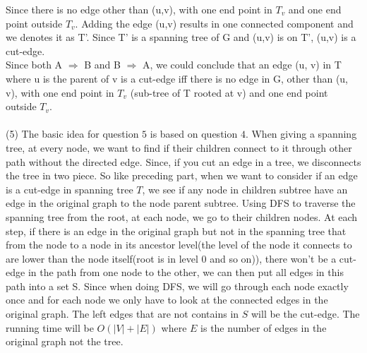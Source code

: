 \documentclass[11pt]{article}
\begin{document}
\begin{solution}
Since there is no edge other than (u,v), with one end point in $T_v$ and one end point outside $T_v$. Adding the edge (u,v) results in one connected component and we denotes it as T'. Since T' is a spanning tree of G and (u,v) is on T', (u,v) is a cut-edge. \\
Since both A $\Rightarrow$ B and B $\Rightarrow$ A, we could conclude that an edge (u, v) in T where u is the parent of v is a cut-edge iff there is no edge in G, other than (u, v), with one end point in $T_v$ (sub-tree of T rooted at v) and one end point outside $T_v$. \\\\
(5) The basic idea for question $5$ is based on question $4$. When giving a spanning tree, at every node, we want to find if their children connect to it through other path without the directed edge. Since, if you cut an edge in a tree, we disconnects the tree in two piece. So like preceding part, when we want to consider if an edge is a cut-edge in spanning tree $T$, we see if any node in children subtree have an edge in the original graph to the node parent subtree. Using DFS to traverse the spanning tree from the root, at each node, we go to their children nodes. At each step, if there is an edge in the original graph but not in the spanning tree that from the node to a node in its ancestor level(the level of the node it connects to are lower than the node itself(root is in level 0 and so on)), there won't be a cut-edge in the path from one node to the other, we can then put all edges in this path into a set S. Since when doing DFS, we will go through each node exactly once and for each node we only have to look at the connected edges in the original graph. The left edges that are not contains in $S$ will be the cut-edge. The running time will be $O(|V| + |E|)$ where $E$ is the number of edges in the original graph not the tree. 
\end{solution}
\end{document}

